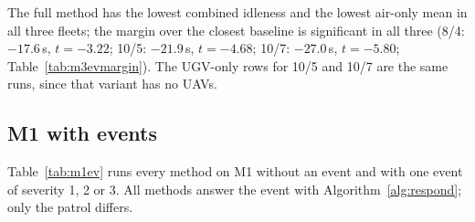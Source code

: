 \documentclass[11pt]{article}
\theoremstyle{definition}
\theoremstyle{plain}
\begin{document}
The full method has the lowest combined idleness and the lowest air-only
mean in all three fleets; the margin over the closest baseline is
significant in all three (8/4: $-17.6$\,s, $t = -3.22$; 10/5: $-21.9$\,s,
$t = -4.68$; 10/7: $-27.0$\,s, $t = -5.80$; Table~\ref{tab:m3evmargin}).
The UGV-only rows for 10/5 and 10/7 are the same runs, since that variant
has no UAVs.

\subsection{M1 with events}
\label{sec:m1ev}

Table~\ref{tab:m1ev} runs every method on M1 without an event and with one
event of severity 1, 2 or 3. All methods answer the event with
Algorithm~\ref{alg:respond}; only the patrol differs.
\end{document}
